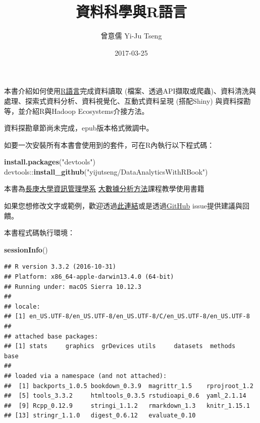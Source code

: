 \documentclass[]{book}
\title{資料科學與R語言}
\author{曾意儒 Yi-Ju Tseng}
\date{2017-03-25}
\newenvironment{Shaded}{\begin{snugshade}}{\end{snugshade}}
\newcommand{\KeywordTok}[1]{\textcolor[rgb]{0.13,0.29,0.53}{\textbf{{#1}}}}
\newcommand{\StringTok}[1]{\textcolor[rgb]{0.31,0.60,0.02}{{#1}}}
\newcommand{\NormalTok}[1]{{#1}}
\theoremstyle{definition}
\theoremstyle{definition}
\theoremstyle{remark}
\begin{document}
\maketitle

{
\setcounter{tocdepth}{1}
\tableofcontents
}
\hypertarget{preface}{\chapter*{}\label{preface}}

本書介紹如何使用\href{http://www.r-project.org/}{R語言}完成資料讀取
(檔案、透過API擷取或爬蟲)、資料清洗與處理、探索式資料分析、資料視覺化、互動式資料呈現
(搭配Shiny) 與資料探勘等，並介紹R與Hadoop Ecosystems介接方法。

資料探勘章節尚未完成，epub版本格式微調中。

如要一次安裝所有本書會使用到的套件，可在R內執行以下程式碼：

\begin{Shaded}
\begin{Highlighting}[]
\KeywordTok{install.packages}\NormalTok{(}\StringTok{"devtools"}\NormalTok{)}
\NormalTok{devtools::}\KeywordTok{install_github}\NormalTok{(}\StringTok{"yijutseng/DataAnalyticsWithRBook"}\NormalTok{)}
\end{Highlighting}
\end{Shaded}

本書為\href{http://im.cgu.edu.tw/bin/home.php}{長庚大學資訊管理學系}
\href{https://github.com/yijutseng/BigDataCGUIM}{大數據分析方法}課程教學使用書籍

如果您想修改文字或範例，歡迎透過\href{https://goo.gl/forms/5Htobvwy2vsB7yiF3}{此連結}或是透過\href{https://github.com/yijutseng/DataAnalyticsWithRBook/issues}{GitHub}
issue提供建議與回饋。

本書程式碼執行環境：

\begin{Shaded}
\begin{Highlighting}[]
\KeywordTok{sessionInfo}\NormalTok{()}
\end{Highlighting}
\end{Shaded}

\begin{verbatim}
## R version 3.3.2 (2016-10-31)
## Platform: x86_64-apple-darwin13.4.0 (64-bit)
## Running under: macOS Sierra 10.12.3
## 
## locale:
## [1] en_US.UTF-8/en_US.UTF-8/en_US.UTF-8/C/en_US.UTF-8/en_US.UTF-8
## 
## attached base packages:
## [1] stats     graphics  grDevices utils     datasets  methods   base     
## 
## loaded via a namespace (and not attached):
##  [1] backports_1.0.5 bookdown_0.3.9  magrittr_1.5    rprojroot_1.2  
##  [5] tools_3.3.2     htmltools_0.3.5 rstudioapi_0.6  yaml_2.1.14    
##  [9] Rcpp_0.12.9     stringi_1.1.2   rmarkdown_1.3   knitr_1.15.1   
## [13] stringr_1.1.0   digest_0.6.12   evaluate_0.10
\end{verbatim}
\end{document}
